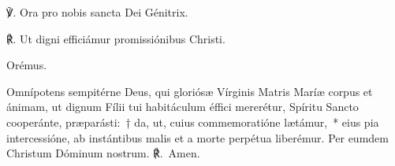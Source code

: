 ℣. Ora pro nobis sancta Dei Génitrix.

℟. \hspace{-0.02em}Ut digni efficiámur promissiónibus Christi.

Orémus.

\noindent Omnípotens sempitérne Deus, qui gloriósæ Vírginis Matris Maríæ corpus et ánimam, ut dignum Fílii tui habitáculum éffici mererétur, Spíritu Sancto cooperánte, præparásti:~† da, ut, cuius commemoratióne lætámur,~* eius pia intercessióne, ab instántibus malis et a morte perpétua liberémur. Per eumdem Christum Dóminum nostrum. ℟.~Amen.